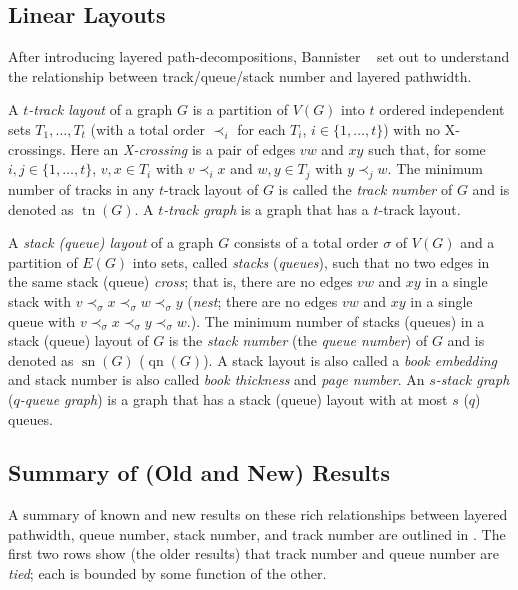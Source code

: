 \documentclass{patmorin}
\DeclareMathOperator{\sn}{sn}
\DeclareMathOperator{\qn}{qn}
\DeclareMathOperator{\tr}{tn}
\begin{document}
\subsection{Linear Layouts}

After introducing layered path-decompositions, Bannister \etal\ \cite{DBLP:conf/gd/BannisterDDEW16,bannister2018track} set
out to understand the relationship between track/queue/stack number and
layered pathwidth.

A \emph{$t$-track layout} of a graph 
$G$ is a partition of $V(G)$ into $t$ ordered independent sets $T_1,\ldots,T_t$ (with a total order $\prec_i$ for each $T_i$, $i\in\{1,\ldots,t\}$) with no X-crossings. Here an \emph{X-crossing} is a pair of edges $vw$ and $xy$ such that, for some $i,j\in\{1,\ldots,t\}$, $v,x\in T_i$ with $v\prec_i x$ and $w,y\in T_j$ with $y\prec_j w$. The minimum number of tracks in any $t$-track layout of $G$ is called the \emph{track number} of $G$ and is denoted as $\tr(G)$. A \emph{$t$-track graph} is a graph that has a $t$-track layout. 

A \emph{stack (queue) layout} of a graph $G$ consists of a total order
$\sigma$ of $V(G)$ and a partition of $E(G)$ into  sets, called
\emph{stacks} (\emph{queues}), such that no two edges in the same
stack (queue) \emph{cross}; that is, there are no edges
$vw$ and $xy$ in a single stack with $v\prec_\sigma x\prec_\sigma w\prec_\sigma y$
(\emph{nest}; there are no edges $vw$ and $xy$ in a single queue with $v\prec_\sigma
x\prec_\sigma y\prec_\sigma w$.).  The minimum number of stacks (queues) in a
stack (queue) layout of $G$ is the \emph{stack number} (the
\emph{queue number}) of $G$ and is denoted as $\sn(G)$ ($\qn(G)$). A stack layout is also called a {\em book embedding} and stack number is also called {\em book thickness} and {\em page number}. An \emph{$s$-stack graph} (\emph{$q$-queue graph}) is a graph that has a stack (queue) layout with at most $s$ ($q$) queues. 

\subsection{Summary of (Old and New) Results} 
A summary of known and new results on these rich relationships between layered pathwidth, queue number, stack number, and track number are outlined in .  The first two rows show (the older results) that track number and queue number are \emph{tied}; each is bounded by some function of the other.  
\end{document}
